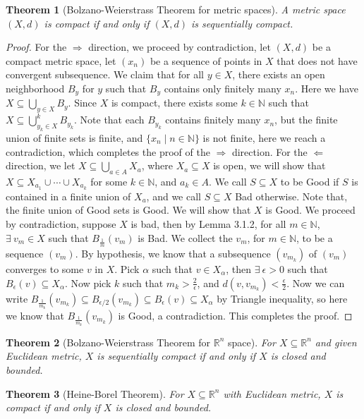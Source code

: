 \documentclass[15pt]{book}
\theoremstyle{break}
\theoremstyle{break}
\newtheorem{thm}{Theorem}[section]
\newcommand{\R}{\mathbb{R}}
\newcommand{\N}{\mathbb{N}}
\begin{document}
\begin{thm}[Bolzano-Weierstrass Theorem for metric spaces]
A metric space $(X,d)$ is compact if and only if $(X,d)$ is sequentially compact.
\end{thm}
\begin{proof}
For the $\Rightarrow$ direction, we proceed by contradiction, let $(X,d)$ be a compact metric space, let $(x_n)$ be a sequence of points in $X$ that does not have convergent subsequence. We claim that for all $y \in X$, there exists an open neighborhood $B_y$ for $y$ such that $B_y$ contains only finitely many $x_n$. Here we have $X \subseteq \bigcup_{y \in X} B_y$. Since $X$ is compact, there exists some $k \in \N$ such that $X \subseteq \bigcup_{y_k \in X}^k B_{y_k}$. Note that each $B_{y_k}$ contains finitely many $x_n$, but the finite union of finite sets is finite, and $\{x_n \mid n \in \N\} $ is not finite, here we reach a contradiction, which completes the proof of the $\Rightarrow$ direction. For the $\Leftarrow$ direction, we let $X \subseteq \bigcup_{a \in A} X_a$, where $X_a\subseteq X$ is open, we will show that $X \subseteq X_{a_1}\cup\cdots\cup X_{a_k}$ for some $k \in \N$, and $a_k \in A$. We call $S \subseteq X$ to be Good if $S$ is contained in a finite union of $X_a$, and we call $S\subseteq X$ Bad otherwise. Note that, the finite union of Good sets is Good. We will show that $X$ is Good. We proceed by contradiction, suppose $X$ is bad, then by Lemma 3.1.2, for all $m \in \N$, $\exists\ v_m \in X$ such that $B_\frac{1}{m}(v_m)$ is Bad. We collect the $v_m$, for $m \in \N$, to be a sequence $(v_m)$. By hypothesis, we know that a subsequence $(v_{m_k})$ of $(v_m)$ converges to some $v$ in $X$. Pick $\alpha$ such that $v \in X_\alpha$, then $\exists\ \epsilon>0$ such that $B_\epsilon(v) \subseteq X_\alpha$. Now pick $k$ such that $m_k > \frac{2}{\epsilon}$, and $d(v,v_{m_k}) < \frac{\epsilon}{2}$. Now we can write $B_{\frac{1}{m_k}}(v_{m_k}) \subseteq B_{\epsilon/2}(v_{m_k}) \subseteq B_{\epsilon}(v) \subseteq X_\alpha$ by Triangle inequality, so here we know that $B_{\frac{1}{m_k}}(v_{m_k})$ is Good, a contradiction. This completes the proof.
\end{proof}

\begin{thm}[Bolzano-Weierstrass Theorem for $\R^n$ space]
For $X \subseteq \R^n$ and given Euclidean metric, $X$ is sequentially compact if and only if $X$ is closed and bounded.
\end{thm}
\begin{thm}[Heine-Borel Theorem]
For $X \subseteq \R^n$ with Euclidean metric, $X$ is compact if and only if $X$ is closed and bounded. 
\end{thm}
\end{document}
